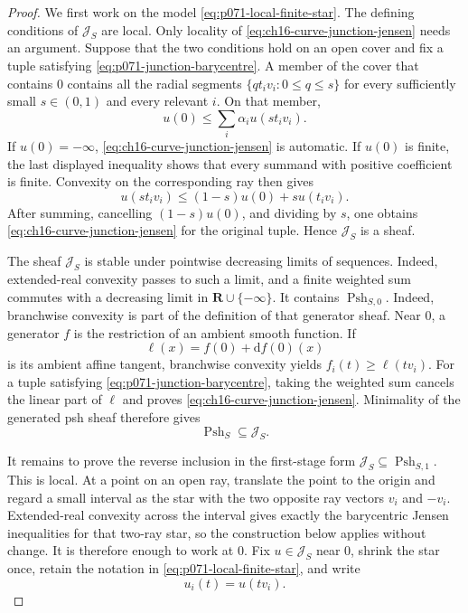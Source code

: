 
\begin{proof}
We first work on the model \eqref{eq:p071-local-finite-star}.  The defining
conditions of $\mathscr J_S$ are local.  Only locality of
\eqref{eq:ch16-curve-junction-jensen} needs an argument.  Suppose that the two
conditions hold on an open cover and fix a tuple satisfying
\eqref{eq:p071-junction-barycentre}.  A member of the cover that contains
$0$ contains all the radial segments
$\{q t_i v_i:0\leq q\leq s\}$ for every sufficiently small
$s\in(0,1)$ and every relevant $i$.  On that member,
\[
                         u(0)\leq
                         \sum_i\alpha_i u(s t_i v_i).
\]
If $u(0)=-\infty$, \eqref{eq:ch16-curve-junction-jensen} is automatic.  If
$u(0)$ is finite, the last displayed inequality shows that every summand
with positive coefficient is finite.  Convexity on the corresponding ray
then gives
\[
                 u(s t_i v_i)
                 \leq(1-s)u(0)+s u(t_i v_i).
\]
After summing, cancelling $(1-s)u(0)$, and dividing by $s$, one obtains
\eqref{eq:ch16-curve-junction-jensen} for the original tuple.  Hence
$\mathscr J_S$ is a sheaf.

The sheaf $\mathscr J_S$ is stable under pointwise decreasing limits of
sequences.  Indeed, extended-real convexity passes to such a limit, and a
finite weighted sum commutes with a decreasing limit in
$\mathbf R\cup\{-\infty\}$.  It contains $\operatorname{Psh}_{S,0}$.
Indeed, branchwise convexity is part of the definition of that generator
sheaf.  Near $0$, a generator $f$ is the restriction of an ambient smooth
function.  If
\[
                      \ell(x)=f(0)+\mathrm d f(0)(x)
\]
is its ambient affine tangent, branchwise convexity yields
$f_i(t)\geq\ell(tv_i)$.  For a tuple satisfying
\eqref{eq:p071-junction-barycentre}, taking the weighted sum cancels the
linear part of $\ell$ and proves \eqref{eq:ch16-curve-junction-jensen}.
Minimality of the generated psh sheaf therefore gives
\begin{equation}
\label{eq:p071-psh-junction-consequences}
                   \operatorname{Psh}_S\subseteq\mathscr J_S.
\end{equation}

It remains to prove the reverse inclusion in the first-stage form
$\mathscr J_S\subseteq\operatorname{Psh}_{S,1}$.  This is local.  At a
point on an open ray, translate the point to the origin and regard a small
interval as the star with the two opposite ray vectors $v_i$ and $-v_i$.
Extended-real convexity across the interval gives exactly the barycentric
Jensen inequalities for that two-ray star, so the construction below
applies without change.  It is therefore enough to work at $0$.  Fix
$u\in\mathscr J_S$ near $0$, shrink the star once, retain the notation in
\eqref{eq:p071-local-finite-star}, and write
\[
                         u_i(t)=u(tv_i).
\]


\end{proof}
